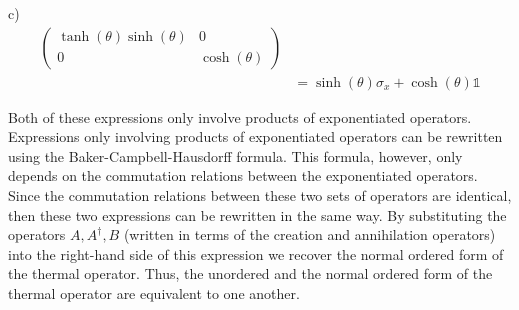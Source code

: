 \begin{homeworkProblem}[Problem 7]
\begin{homeworkSection}{c)}
\begin{align}
\begin{pmatrix}
         \tanh(\theta) \sinh(\theta) & 0 \\
         0 & \cosh(\theta)
      \end{pmatrix} \\
      &= \sinh(\theta) \sigma_{x} + \cosh(\theta) \mathds{1}
\end{align}
\end{homeworkSection}
\begin{homeworkSection}
   Both of these expressions only involve products of exponentiated operators.
   Expressions only involving products of exponentiated operators can be
   rewritten using the Baker-Campbell-Hausdorff formula. This formula, however,
   only depends on the commutation relations between the exponentiated
   operators. Since the commutation relations between these two sets of
   operators are identical, then these two expressions can be rewritten in the
   same way. By substituting the operators $ A, A^{\dagger}, B $ (written in terms of the
   creation and annihilation operators) into the right-hand side of this
   expression we recover the normal ordered form of the thermal operator. Thus,
   the unordered and the normal ordered form of the thermal operator are
   equivalent to one another.
\end{homeworkSection}
\end{homeworkProblem}
